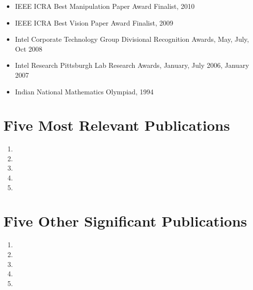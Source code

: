 \documentclass[10pt]{article}
\begin{document}
\begin{itemize}
\item IEEE ICRA Best Manipulation Paper Award Finalist, 2010
\item IEEE ICRA Best Vision Paper Award Finalist, 2009
\item Intel Corporate Technology Group Divisional Recognition Awards, May, July, Oct 2008
\item Intel Research Pittsburgh Lab Research Awards, January, July 2006, January 2007
\item Indian National Mathematics Olympiad, 1994
\end{itemize}



\section{Five Most Relevant Publications}
\renewcommand{\labelenumi}{[ \arabic{enumi} ]\hfill}
\begin{enumerate}

\item {}

\item {}

\item {}

\item {}

\item {}


\end{enumerate}

\section{Five Other Significant Publications}
\renewcommand{\labelenumi}{[ \arabic{enumi} ]\hfill}
\begin{enumerate}

\item {}

\item {}

\item {}

\item {}

\item {}


\end{enumerate}
\end{document}
